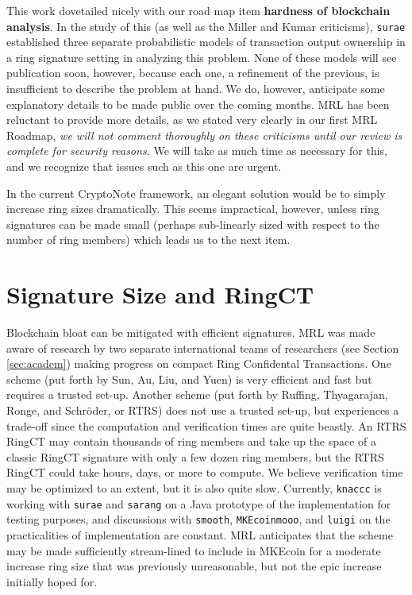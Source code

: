\documentclass[12pt,english]{mrl}
\theoremstyle{definition}
\numberwithin{equation}{section}
\numberwithin{figure}{section}
\numberwithin{equation}{section}
\numberwithin{equation}{section}
\numberwithin{figure}{section}
\begin{document}
This work dovetailed nicely with our road map item \textbf{hardness of blockchain analysis}.  In the study of this (as well as the Miller and Kumar criticisms), \texttt{surae} established three separate probabilistic models of transaction output ownership in a ring signature setting in analyzing this problem. None of these models will see publication soon, however, because each one, a refinement of the previous, is insufficient to describe the problem at hand. We do, however, anticipate some explanatory details to be made public over the coming months. MRL has been reluctant to provide more details, as we stated very clearly in our first MRL Roadmap, \emph{we will not comment thoroughly on these criticisms until our review is complete for security reasons.} We will take as much time as necessary for this, and we recognize that issues such as this one are urgent.
    
In the current CryptoNote framework, an elegant solution would be to simply increase ring sizes dramatically. This seems impractical, however, unless ring signatures can be made small (perhaps sub-linearly sized with respect to the number of ring members) which leads us to the next item.
    
\section{Signature Size and RingCT}

Blockchain bloat can be mitigated with efficient signatures. MRL was made aware of research by two separate international teams of researchers (see Section \ref{sec:academ}) making progress on compact Ring Confidental Transactions. One scheme (put forth by Sun, Au, Liu, and Yuen) is very efficient and fast but requires a trusted set-up. Another scheme (put forth by Ruffing,  Thyagarajan, Ronge, and Schr{\"o}der, or RTRS) does not use a trusted set-up, but experiences a trade-off since the computation and verification times are quite beastly. An RTRS RingCT may contain thousands of ring members and take up the space of a classic RingCT signature with only a few dozen ring members, but the RTRS RingCT could take hours, days, or more to compute. We believe verification time may be optimized to an extent, but it is also quite slow. Currently, \texttt{knaccc} is working with \texttt{surae} and \texttt{sarang} on a Java prototype of the implementation for testing purposes, and discussions with \texttt{smooth}, \texttt{MKEcoinmooo}, and \texttt{luigi} on the practicalities of implementation are constant. MRL anticipates that the scheme may be made sufficiently stream-lined to include in MKEcoin for a moderate increase ring size that was previously unreasonable, but not the epic increase initially hoped for.
    
\end{document}
